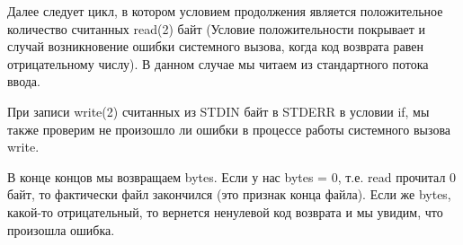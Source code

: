 Далее следует цикл, в котором условием продолжения является положительное количество считанных read(2) байт (Условие положительности покрывает и случай возникновение ошибки системного вызова, когда код возврата равен отрицательному числу). В данном случае мы читаем из стандартного потока ввода.

При записи write(2) считанных из STDIN байт в STDERR в условии if, мы также проверим не произошло ли ошибки в процессе работы системного вызова write.

В конце концов мы возвращаем bytes. Если у нас bytes = 0, т.е. read прочитал 0 байт, то фактически файл закончился (это признак конца файла). Если же bytes, какой-то отрицательный, то вернется ненулевой код возврата и мы увидим, что произошла ошибка. 

